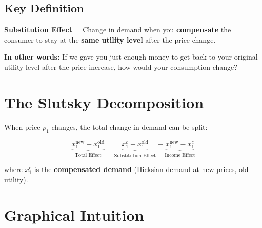 \documentclass[11pt]{article}
\begin{document}
\subsection{Key Definition}

\begin{center}
\colorbox{yellow!30}{
\begin{minipage}{0.9\textwidth}
\textbf{Substitution Effect} = Change in demand when you \textbf{compensate} the consumer to stay at the \textbf{same utility level} after the price change.
\end{minipage}
}
\end{center}

\textbf{In other words:} If we gave you just enough money to get back to your original utility level after the price increase, how would your consumption change?

\section{The Slutsky Decomposition}

When price $p_1$ changes, the total change in demand can be split:

$$\boxed{\underbrace{x_1^{\text{new}} - x_1^{\text{old}}}_{\text{Total Effect}} = \underbrace{x_1^c - x_1^{\text{old}}}_{\text{Substitution Effect}} + \underbrace{x_1^{\text{new}} - x_1^c}_{\text{Income Effect}}}$$

where $x_1^c$ is the \textbf{compensated demand} (Hicksian demand at new prices, old utility).

\section{Graphical Intuition}
\end{document}
